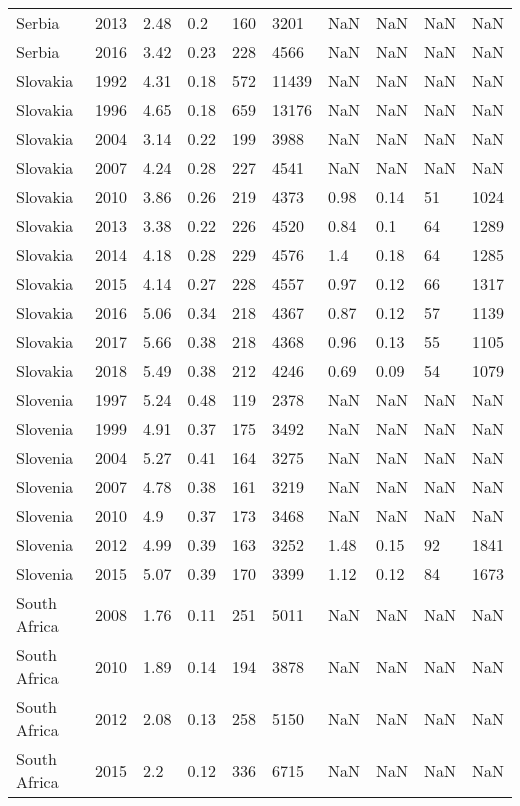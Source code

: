 \begin{tabular}{llllllllll}
Serbia & 2013 & 2.48 & 0.2 & 160 & 3201 & NaN & NaN & NaN & NaN \\ 
Serbia & 2016 & 3.42 & 0.23 & 228 & 4566 & NaN & NaN & NaN & NaN \\ 
Slovakia & 1992 & 4.31 & 0.18 & 572 & 11439 & NaN & NaN & NaN & NaN \\ 
Slovakia & 1996 & 4.65 & 0.18 & 659 & 13176 & NaN & NaN & NaN & NaN \\ 
Slovakia & 2004 & 3.14 & 0.22 & 199 & 3988 & NaN & NaN & NaN & NaN \\ 
Slovakia & 2007 & 4.24 & 0.28 & 227 & 4541 & NaN & NaN & NaN & NaN \\ 
Slovakia & 2010 & 3.86 & 0.26 & 219 & 4373 & 0.98 & 0.14 & 51 & 1024 \\ 
Slovakia & 2013 & 3.38 & 0.22 & 226 & 4520 & 0.84 & 0.1 & 64 & 1289 \\ 
Slovakia & 2014 & 4.18 & 0.28 & 229 & 4576 & 1.4 & 0.18 & 64 & 1285 \\ 
Slovakia & 2015 & 4.14 & 0.27 & 228 & 4557 & 0.97 & 0.12 & 66 & 1317 \\ 
Slovakia & 2016 & 5.06 & 0.34 & 218 & 4367 & 0.87 & 0.12 & 57 & 1139 \\ 
Slovakia & 2017 & 5.66 & 0.38 & 218 & 4368 & 0.96 & 0.13 & 55 & 1105 \\ 
Slovakia & 2018 & 5.49 & 0.38 & 212 & 4246 & 0.69 & 0.09 & 54 & 1079 \\ 
Slovenia & 1997 & 5.24 & 0.48 & 119 & 2378 & NaN & NaN & NaN & NaN \\ 
Slovenia & 1999 & 4.91 & 0.37 & 175 & 3492 & NaN & NaN & NaN & NaN \\ 
Slovenia & 2004 & 5.27 & 0.41 & 164 & 3275 & NaN & NaN & NaN & NaN \\ 
Slovenia & 2007 & 4.78 & 0.38 & 161 & 3219 & NaN & NaN & NaN & NaN \\ 
Slovenia & 2010 & 4.9 & 0.37 & 173 & 3468 & NaN & NaN & NaN & NaN \\ 
Slovenia & 2012 & 4.99 & 0.39 & 163 & 3252 & 1.48 & 0.15 & 92 & 1841 \\ 
Slovenia & 2015 & 5.07 & 0.39 & 170 & 3399 & 1.12 & 0.12 & 84 & 1673 \\ 
South Africa & 2008 & 1.76 & 0.11 & 251 & 5011 & NaN & NaN & NaN & NaN \\ 
South Africa & 2010 & 1.89 & 0.14 & 194 & 3878 & NaN & NaN & NaN & NaN \\ 
South Africa & 2012 & 2.08 & 0.13 & 258 & 5150 & NaN & NaN & NaN & NaN \\ 
South Africa & 2015 & 2.2 & 0.12 & 336 & 6715 & NaN & NaN & NaN & NaN \\ 

\end{tabular}
